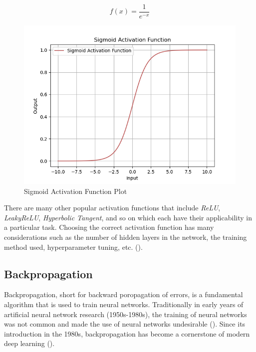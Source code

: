 \begin{itemize}
    \begin{equation}\label{alg:sigmoid_function}
        f(x) = \frac{1}{e^{-x}}
    \end{equation}

    \begin{figure}[H] %
        \centering %
        \includegraphics[width=\textwidth]{Figures/chapter_ne/ne_sigmoid_plot.png} %
        \caption{Sigmoid Activation Function Plot}
        \label{fig:ne_sigmoid_plot} %
    \end{figure}
\end{itemize}

\noindent There are many other popular activation functions that include \textit{ReLU}, \textit{LeakyReLU}, \textit{Hyperbolic Tangent}, and so on which each have their applicability in a particular task. Choosing the correct activation function has many considerations such as the number of hidden layers in the network, the training method used, hyperparameter tuning, etc. (\cite{sharma2017activation}).

\subsection{Backpropagation}
Backpropagation, short for backward poropagation of errors, is a fundamental algorithm that is used to train neural networks. Traditionally in early years of artificial neural network research (1950s-1980s), the training of neural networks was not common and made the use of neural networks undesirable (\cite{aggarwal2018neural}). Since its introduction in the 1980s, backpropagation has become a cornerstone of modern deep learning (\cite{aggarwal2018neural}). \bigskip

